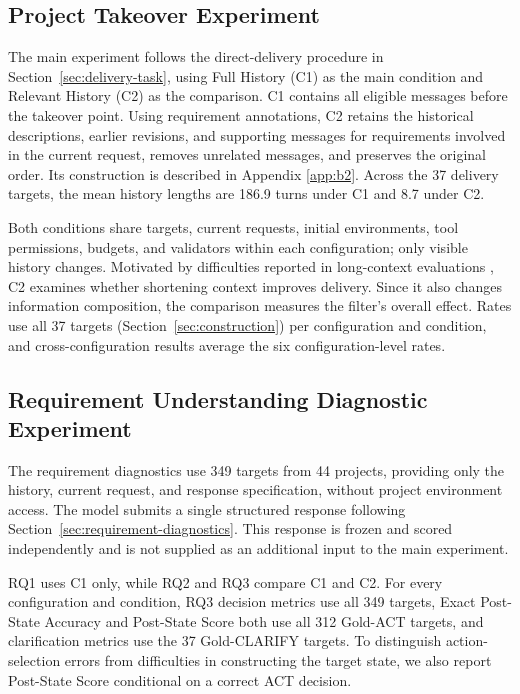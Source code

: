 \documentclass{article} %
\begin{document}
\subsection{Project Takeover Experiment}
\label{sec:main-experiment}

The main experiment follows the direct-delivery procedure in Section~\ref{sec:delivery-task}, using Full History (C1) as the main condition and Relevant History (C2) as the comparison. C1 contains all eligible messages before the takeover point. Using requirement annotations, C2 retains the historical descriptions, earlier revisions, and supporting messages for requirements involved in the current request, removes unrelated messages, and preserves the original order. Its construction is described in Appendix \ref{app:b2}. Across the 37 delivery targets, the mean history lengths are 186.9 turns under C1 and 8.7 under C2.

Both conditions share targets, current requests, initial environments, tool permissions, budgets, and validators within each configuration; only visible history changes. Motivated by difficulties reported in long-context evaluations \citep{bai2024longbench,hsieh2024ruler}, C2 examines whether shortening context improves delivery. Since it also changes information composition, the comparison measures the filter's overall effect. Rates use all 37 targets (Section~\ref{sec:construction}) per configuration and condition, and cross-configuration results average the six configuration-level rates.

\subsection{Requirement Understanding Diagnostic Experiment}
\label{sec:diagnostics-experiment}

The requirement diagnostics use 349 targets from 44 projects, providing only the history, current request, and response specification, without project environment access. The model submits a single structured response following Section~\ref{sec:requirement-diagnostics}. This response is frozen and scored independently and is not supplied as an additional input to the main experiment.

RQ1 uses C1 only, while RQ2 and RQ3 compare C1 and C2. For every configuration and condition, RQ3 decision metrics use all 349 targets, Exact Post-State Accuracy and Post-State Score both use all 312 Gold-ACT targets, and clarification metrics use the 37 Gold-CLARIFY targets. To distinguish action-selection errors from difficulties in constructing the target state, we also report Post-State Score conditional on a correct ACT decision.
\end{document}
